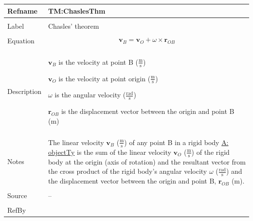 \documentclass[12pt]{article}
\begin{document}
\noindent \begin{minipage}{\textwidth}
\begin{tabular}{p{} p{}}
\toprule \textbf{Refname} & \textbf{TM:ChaslesThm}
\label{TM:ChaslesThm}
\\ \midrule \\
Label & Chasles' theorem
\\ \midrule \\
Equation & \begin{displaymath}
           {\mathbf{v}_{B}}={\mathbf{v}_{O}}+ω\times{\mathbf{r}_{OB}}
           \end{displaymath}
\\ \midrule \\
Description & \begin{symbDescription}
              \item{${\mathbf{v}_{B}}$ is the velocity at point B ($\frac{\text{m}}{\text{s}}$)}
              \item{${\mathbf{v}_{O}}$ is the velocity at point origin ($\frac{\text{m}}{\text{s}}$)}
              \item{$ω$ is the angular velocity ($\frac{\text{rad}}{\text{s}}$)}
              \item{${\mathbf{r}_{OB}}$ is the displacement vector between the origin and point B (m)}
              \end{symbDescription}
\\ \midrule \\
Notes & The linear velocity ${\mathbf{v}_{B}}$ ($\frac{\text{m}}{\text{s}}$) of any point B in a rigid body \hyperref[assumpOT]{A: objectTy} is the sum of the linear velocity ${\mathbf{v}_{O}}$ ($\frac{\text{m}}{\text{s}}$) of the rigid body at the origin (axis of rotation) and the resultant vector from the cross product of the rigid body's angular velocity $ω$ ($\frac{\text{rad}}{\text{s}}$) and the displacement vector between the origin and point B, ${\mathbf{r}_{OB}}$ (m).
\\ \midrule \\
Source & --
\\ \midrule \\
RefBy & 
\\ \bottomrule \end{tabular}
\end{minipage}
\par~
\end{document}
